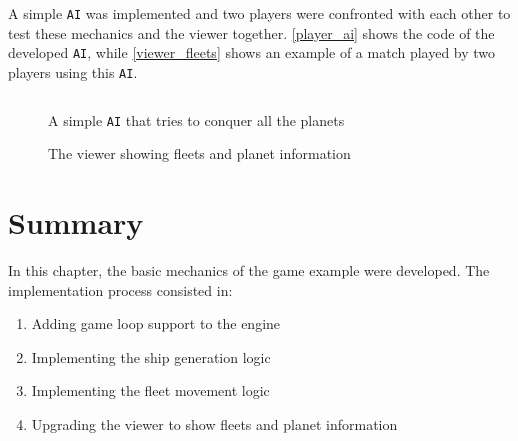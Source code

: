 \documentclass[a4paper,11pt,titlepage,abstract,numbers=noenddot,automark,mnsy,intlimits,rgb,dvipsnames]{report}
\begin{document}
A simple \texttt{AI} was implemented and two players were confronted with each other to test these mechanics and the viewer together.
\autoref{player_ai} shows the code of the developed \texttt{AI}, while \autoref{viewer_fleets} shows an example of a match
played by two players using this \texttt{AI}.
\begin{figure}[H]
\inputminted[linenos,fontsize=\small,frame=lines,framesep=2mm]{c++}{code/ai.cpp}
\caption{A simple \texttt{AI} that tries to conquer all the planets}
\label{player_ai}
\end{figure}
\begin{figure}[H]
\noindent{}
\caption{The viewer showing fleets and planet information}
\label{viewer_fleets}
\end{figure}
\section{Summary}
In this chapter, the basic mechanics of the game example were developed. The implementation process consisted in:
\begin{enumerate}
\item
Adding game loop support to the engine
\item
Implementing the ship generation logic
\item
Implementing the fleet movement logic
\item
Upgrading the viewer to show fleets and planet information
\end{enumerate}
\end{document}
